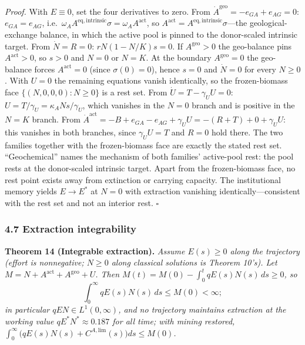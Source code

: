 \documentclass[11pt]{article}
\begin{document}
\emph{Proof.} With \(E \equiv 0\), set the four derivatives to zero. From \(\dot A^{\mathrm{geo}} = -e_{GA} + e_{AG} = 0\): \(e_{GA} = e_{AG}\), i.e.~\(\omega_A A^{\mathrm{eq,intrinsic}} \sigma = \omega_A A^{\mathrm{act}}\), so \(A^{\mathrm{act}} = A^{\mathrm{eq,intrinsic}} \sigma\)---the geological-exchange balance, in which the active pool is pinned to the donor-scaled intrinsic target. From \(\dot N = R = 0\): \(rN(1 - N/\allowbreak{}K)s = 0\). If \(A^{\mathrm{geo}} > 0\) the geo-balance pins \(A^{\mathrm{act}} > 0\), so \(s > 0\) and \(N = 0\) or \(N = K\). At the boundary \(A^{\mathrm{geo}} = 0\) the geo-balance forces \(A^{\mathrm{act}} = 0\) (since \(\sigma(0) = 0\)), hence \(s = 0\) and \(\dot N = 0\) for every \(N \ge 0\). With \(U = 0\) the remaining equations vanish identically, so the frozen-biomass face \(\{(N, 0, 0, 0) : N \ge 0\}\) is a rest set. From \(\dot U = T - \gamma_U U = 0\): \(U = T/\gamma_U = \kappa_A N s/\gamma_U\), which vanishes in the \(N = 0\) branch and is positive in the \(N = K\) branch. From \(\dot A^{\mathrm{act}} = -B + e_{GA} - e_{AG} + \gamma_U U = -(R + T) + 0 + \gamma_U U\): this vanishes in both branches, since \(\gamma_U U = T\) and \(R = 0\) hold there. The two families together with the frozen-biomass face are exactly the stated rest set. ``Geochemical'' names the mechanism of both families' active-pool rest: the pool rests at the donor-scaled intrinsic target. Apart from the frozen-biomass face, no rest point exists away from extinction or carrying capacity. The institutional memory yields \(E \to E^*\) at \(N = 0\) with extraction vanishing identically---consistent with the rest set and not an interior rest. \ensuremath{\square}

\subsubsection{4.7 Extraction
integrability}\label{extraction-integrability}

\textbf{Theorem 14 (Integrable extraction).} \emph{Assume \(E(s) \ge 0\)
along the trajectory (effort is nonnegative; \(N \ge 0\) along classical
solutions is Theorem 10's). Let
\(M = N + A^{\mathrm{act}} + A^{\mathrm{geo}} + U\). Then
\(M(t) = M(0) - \int_0^t qE(s)N(s)\, ds \ge 0\), so}
\[\int_0^\infty qE(s)N(s)\, ds \le M(0) < \infty;\] \emph{in particular
\(qEN \in L^1(0,\infty)\), and no trajectory maintains extraction at the
working value \(qE^*N^* \approx 0.187\) for all time; with mining
restored,
\(\int_0^\infty \bigl( qE(s)N(s) + C^{A,\mathrm{lim}}(s) \bigr) ds \le M(0)\).}
\end{document}
